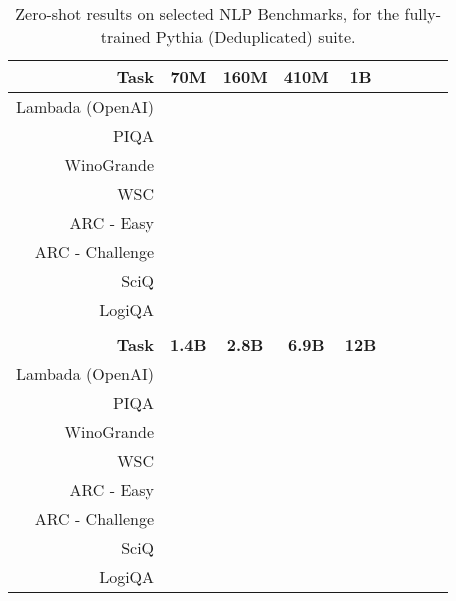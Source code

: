 \documentclass{article}
\theoremstyle{plain}
\theoremstyle{definition}
\theoremstyle{remark}
\begin{document}
\begin{table}[H]
\centering
\begin{tabular}{rcccccccc}
\toprule
\textbf{Task} & \textbf{70M} & \textbf{160M} & \textbf{410M} & \textbf{1B} \\
\midrule
Lambada (OpenAI) &  &  &  &  \\
PIQA &  &  &  &  \\
WinoGrande &  &  &  &   \\
WSC &  &  &  &   \\
ARC - Easy &  &  &  &   \\
ARC - Challenge &  &  &  &   \\
SciQ &  &  &  &   \\
LogiQA &  &  &  &   \\
\bottomrule
\\
\textbf{Task} & \textbf{1.4B} & \textbf{2.8B} & \textbf{6.9B} & \textbf{12B} \\
\midrule
Lambada (OpenAI) & &  &  &  \\
PIQA &  &  &  &  \\
WinoGrande &  &  &  &  \\
WSC &  &  &  &  \\
ARC - Easy &  &  &  &  \\
ARC - Challenge &  &  &  &  \\
SciQ &  &  &  &  \\
LogiQA &  &  &  &  \\
\bottomrule
\end{tabular}
\caption{Zero-shot results on selected NLP Benchmarks, for the fully-trained Pythia (Deduplicated) suite.}
\end{table}
\end{document}
